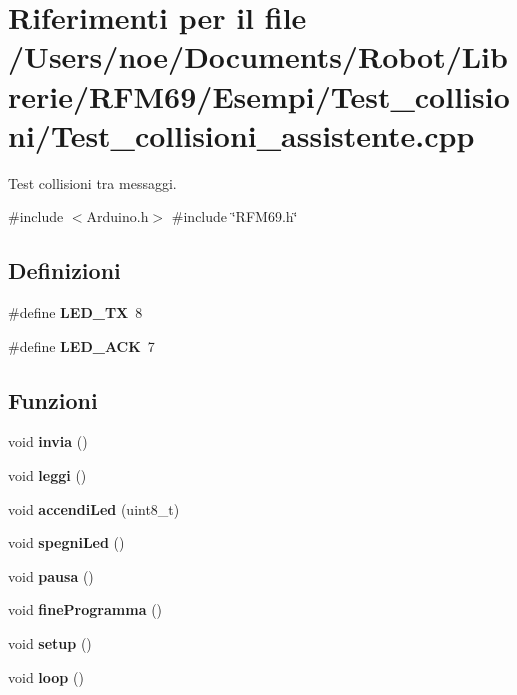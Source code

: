 \section{Riferimenti per il file /\+Users/noe/\+Documents/\+Robot/\+Librerie/\+R\+F\+M69/\+Esempi/\+Test\+\_\+collisioni/\+Test\+\_\+collisioni\+\_\+assistente.cpp}
\label{_test__collisioni__assistente_8cpp}


Test collisioni tra messaggi.  


{\ttfamily \#include $<$Arduino.\+h$>$}\newline
{\ttfamily \#include \char`\"{}R\+F\+M69.\+h\char`\"{}}\newline
\subsection*{Definizioni}
\begin{DoxyCompactItemize}
\item 
\mbox{\label{_test__collisioni__assistente_8cpp_a66dbe921e452d7831e1f1f7ff8d720ff}} 
\#define {\bfseries L\+E\+D\+\_\+\+TX}~8
\item 
\mbox{\label{_test__collisioni__assistente_8cpp_a365035e660d1eae73ced4109ba9f8288}} 
\#define {\bfseries L\+E\+D\+\_\+\+A\+CK}~7
\end{DoxyCompactItemize}
\subsection*{Funzioni}
\begin{DoxyCompactItemize}
\item 
\mbox{\label{_test__collisioni__assistente_8cpp_a30929ad9aa20be449cfdcfdf096b011f}} 
void {\bfseries invia} ()
\item 
\mbox{\label{_test__collisioni__assistente_8cpp_a5ba7c94d7b647769c1eab4535fdf0ca4}} 
void {\bfseries leggi} ()
\item 
\mbox{\label{_test__collisioni__assistente_8cpp_a3569164e5c9c054a56d5f70566d8a57d}} 
void {\bfseries accendi\+Led} (uint8\+\_\+t)
\item 
\mbox{\label{_test__collisioni__assistente_8cpp_a06e193cb7e01cd99fcfee23c739abac9}} 
void {\bfseries spegni\+Led} ()
\item 
\mbox{\label{_test__collisioni__assistente_8cpp_ad3befffba77b3954d6bbea4d22afc517}} 
void {\bfseries pausa} ()
\item 
\mbox{\label{_test__collisioni__assistente_8cpp_ae1b6bae9fef1e0d04a56b321386b699c}} 
void {\bfseries fine\+Programma} ()
\item 
\mbox{\label{_test__collisioni__assistente_8cpp_a4fc01d736fe50cf5b977f755b675f11d}} 
void {\bfseries setup} ()
\item 
\mbox{\label{_test__collisioni__assistente_8cpp_afe461d27b9c48d5921c00d521181f12f}} 
void {\bfseries loop} ()
\end{DoxyCompactItemize}
